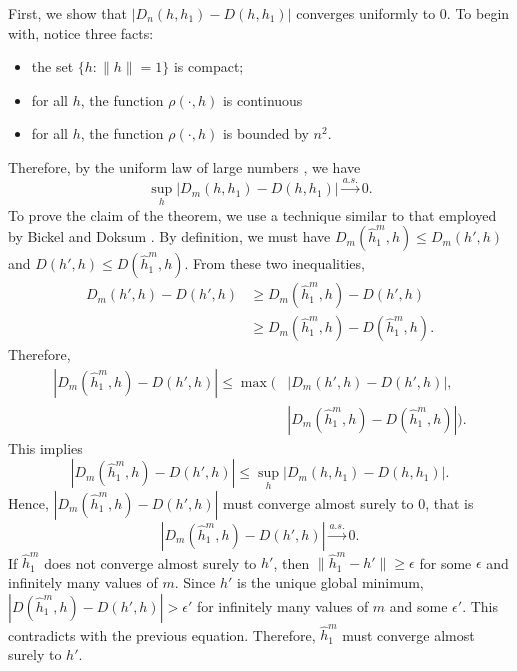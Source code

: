 \documentclass[10pt,journal,compsoc]{IEEEtran}
\newenvironment{proof}[1][Proof]{\begin{trivlist}
		\item[\hskip \labelsep {\bfseries #1}]}{\end{trivlist}}
\begin{document}
\begin{proof} [Proof of Theorem 4.1]
First,  we show that $|D_n(h,h_1)-D(h,h_1)|$ converges uniformly to $0$. To begin with, notice three facts:
\begin{itemize}
	\item[(1)] the set $\{h: \|h\|=1\}$ is compact;
	\item[(2)] for all $h$, the function $\rho(\cdot,h)$ is continuous
	\item[(3)] for all $h$, the function $\rho(\cdot,h)$ is bounded by $n^2$.
\end{itemize}
Therefore, by the uniform law of large numbers \cite{jennrich1969asymptotic}, we have
\[\underset{h}{\sup}|D_m(h,h_1)-D(h,h_1)|\overset{a.s.}{\rightarrow} 0.\]
To prove the claim of the theorem, we use a technique similar to that employed by Bickel and Doksum \cite{bickel2015mathematical}. By definition, we must have $D_m(\hat{h}_1^m,h)  \leq D_m(h',h)$ and $D(h',h) \leq D(\hat{h}_1^m,h)$. From these two inequalities,
\begin{align*}
D_m(h',h)-D(h',h) &\geq D_m(\hat{h}_1^m,h)-D(h',h) \\
&\geq D_m(\hat{h}_1^m,h)-D(\hat{h}_1^m,h) .
\end{align*}
Therefore, 
\begin{align*}
|D_m(\hat{h}_1^m,h)-D(h',h)|  \leq  \max(&|D_m(h',h)-D(h',h)|,\\
& |D_m(\hat{h}_1^m,h)-D(\hat{h}_1^m,h)|).
\end{align*}
This implies 
\[ |D_m(\hat{h}_1^m,h)-D(h',h)| \leq \underset{h}{\sup}|D_m(h,h_1)-D(h,h_1)|. \]
Hence, $|D_m(\hat{h}_1^m,h)-D(h',h)|$ must converge almost surely to $0$, that is
\[|D_m(\hat{h}_1^m,h)-D(h',h)|\overset{a.s.}{\rightarrow} 0 .\]
 If $\hat{h}_1^m$ does not converge almost surely to $h'$, then  $\|\hat{h}_1^m-h'\|\geq \epsilon$ for some $\epsilon$ and infinitely many values of $m$. Since $h'$ is the unique global minimum, $|D(\hat{h}_1^m,h)-D(h',h)| > \epsilon' $ for infinitely many values of $m$ and some $\epsilon' $. This contradicts with the previous equation. Therefore, $\hat{h}_1^m$ must converge almost surely to $h'$.
\end{proof}
\end{document}
